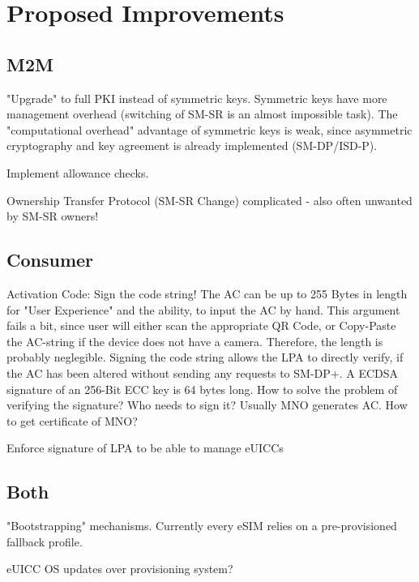 
\chapter{Proposed Improvements}\label{chapter:propImprovements}

\section{M2M}
"Upgrade" to full PKI instead of symmetric keys. Symmetric keys have more management overhead (switching of SM-SR is an almost impossible task). The "computational overhead" advantage of symmetric keys is weak, since asymmetric cryptography and key agreement is already implemented (SM-DP/ISD-P).

Implement allowance checks. 

Ownership Transfer Protocol (SM-SR Change) complicated - also often unwanted by SM-SR owners!

\section{Consumer}
Activation Code: Sign the code string!
The AC can be up to 255 Bytes in length for "User Experience" and the ability, to input the AC by hand. This argument fails a bit, since user will either scan the appropriate QR Code, or Copy-Paste the AC-string if the device does not have a camera. Therefore, the length is probably neglegible.
Signing the code string allows the LPA to directly verify, if the AC has been altered without sending any requests to SM-DP+. A ECDSA signature of an 256-Bit ECC key is 64 bytes long. 
How to solve the problem of verifying the signature? Who needs to sign it? Usually MNO generates AC. How to get certificate of MNO?

Enforce signature of LPA to be able to manage eUICCs

\section{Both}
"Bootstrapping" mechanisms. Currently every eSIM relies on a pre-provisioned fallback profile.

eUICC OS updates over provisioning system? 